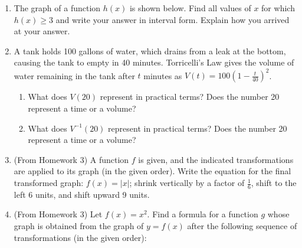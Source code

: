 \documentclass[11pt]{article}
\begin{document}
\begin{enumerate}
\item The graph of a function $h(x)$ is shown below. Find all values of $x$ for which $h(x)\geq 3$ and write your answer in interval form. Explain how you arrived at your answer. 

\begin{center}
\end{center}

\item A tank holds 100 gallons of water, which drains from a leak at the bottom, causing the tank to empty in 40 minutes. Torricelli's Law gives the volume of water remaining in the tank after $t$ minutes as $\displaystyle V(t)=100\left (1-\frac{t}{40}\right )^2$.

\begin{enumerate}
\item What does $V(20)$ represent in practical terms? Does the number 20 represent a time or a volume?
\item What does $\displaystyle V^{-1}(20)$ represent in practical terms? Does the number 20 represent a time or a volume?
\end{enumerate}

\item (From Homework 3) A function $f$ is given, and the indicated transformations are applied to its graph (in the given order). Write the equation for the final transformed graph:
$\displaystyle f(x) = |x|$;
 shrink vertically by a factor of $\displaystyle \frac{1}{6}$, 
shift to the left 6 units, and shift upward 9 units.

\item (From Homework 3) Let 
$\displaystyle f(x) = x^2$.
 Find a formula for a function $g$ whose graph is obtained from the graph of 
$y = f(x)$ after the following sequence of transformations (in the given order):




\end{enumerate}
\end{document}
